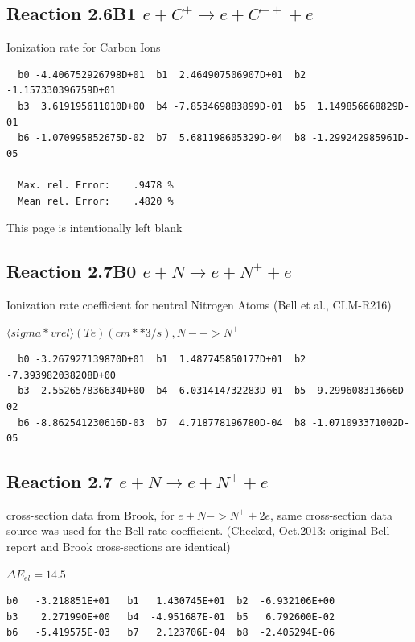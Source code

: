 \documentclass[12pt,dvips]{article}
\begin{document}
\subsection{
Reaction 2.6B1   $e + C^+ \rightarrow e + C^{++} + e  $
}

  Ionization rate for Carbon Ions


\begin{small}\begin{verbatim}
  b0 -4.406752926798D+01  b1  2.464907506907D+01  b2 -1.157330396759D+01
  b3  3.619195611010D+00  b4 -7.853469883899D-01  b5  1.149856668829D-01
  b6 -1.070995852675D-02  b7  5.681198605329D-04  b8 -1.299242985961D-05

  Max. rel. Error:    .9478 %
  Mean rel. Error:    .4820 %

\end{verbatim}\end{small}
\newpage
This page is intentionally left blank
\newpage



\subsection{
Reaction 2.7B0   $e + N \rightarrow e + N^+ + e  $
}

  Ionization rate coefficient for neutral Nitrogen Atoms
  (Bell et al., CLM-R216) \cite{kn:Bell}

  $ \langle sigma*vrel \rangle(Te)  (cm**3/s), N --> N^+$

\begin{small}\begin{verbatim}
  b0 -3.267927139870D+01  b1  1.487745850177D+01  b2 -7.393982038208D+00
  b3  2.552657836634D+00  b4 -6.031414732283D-01  b5  9.299608313666D-02
  b6 -8.862541230616D-03  b7  4.718778196780D-04  b8 -1.071093371002D-05

\end{verbatim}\end{small}

\subsection{
Reaction 2.7    $e + N \rightarrow e + N^+ + e  $
}
cross-section data from Brook, \cite{kn:Brook}   for $ e + N -> N^+ + 2e $,
same cross-section data source was used for the Bell rate coefficient. (Checked, Oct.2013: original Bell report and Brook cross-sections
are identical)

$\Delta E_{el} = 14.5$
\begin{small}\begin{verbatim}
b0   -3.218851E+01   b1   1.430745E+01  b2  -6.932106E+00
b3    2.271990E+00   b4  -4.951687E-01  b5   6.792600E-02
b6   -5.419575E-03   b7   2.123706E-04  b8  -2.405294E-06
\end{verbatim}\end{small}
\end{document}
